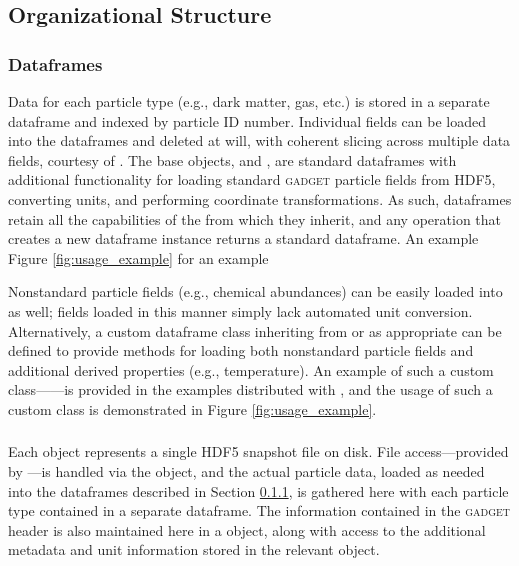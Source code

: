 \subsection{Organizational Structure}
\label{sec:hierarchy}

\subsubsection{ Dataframes}
\label{sec:df}
Data for each particle type (e.g., dark matter, gas, etc.) is stored in a separate  dataframe and indexed by particle ID number. 
Individual fields can be loaded into the dataframes and deleted at will, with coherent slicing across multiple data fields, courtesy of .  
The base  objects,  and , are standard  dataframes with additional functionality for loading standard \textsc{gadget} particle fields from HDF5, converting units, and performing coordinate transformations.  
As such,  dataframes retain all the capabilities of the  from which they inherit, and any operation that creates a new dataframe instance returns a standard  dataframe.  An example  Figure \ref{fig:usage_example} for an example 

Nonstandard particle fields (e.g., chemical abundances) can be easily loaded into  as well; fields loaded in this manner simply lack automated unit conversion.
Alternatively, a custom dataframe class inheriting from  or  as appropriate can be defined to provide methods for loading both nonstandard particle fields and additional derived properties (e.g., temperature). An example of such a custom class------is provided in the examples distributed with , and the usage of such a custom class is demonstrated in Figure \ref{fig:usage_example}.

\subsubsection{}
\label{sec:snap}
Each  object represents a single HDF5 snapshot file on disk.  File access---provided by  \citep{h5py}---is handled via the  object, and the actual particle data, loaded as needed into the  dataframes described in Section \ref{sec:df}, is gathered here with each particle type contained in a separate  dataframe.  
The information contained in the \textsc{gadget} header is also maintained here in a  object, along with access to the additional metadata and unit information stored in the relevant  object.

